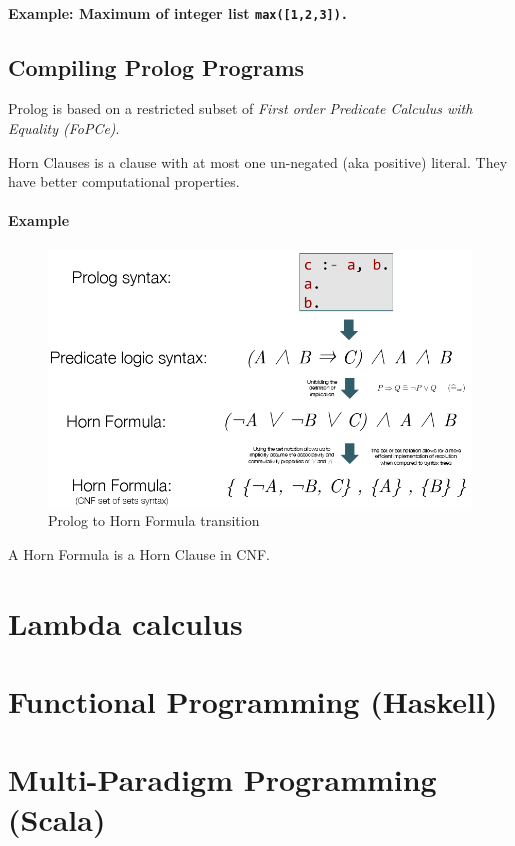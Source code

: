 \paragraph{Example: Maximum of integer list \lstinline|max([1,2,3]).|}


\subsection{Compiling Prolog Programs}

Prolog is based on a restricted subset of \emph{First order Predicate Calculus with Equality (FoPCe)}.

Horn Clauses is a clause with at most one un-negated (aka positive) literal. They have better computational properties.

\paragraph{Example}

\begin{figure}[h]
\centering
\includegraphics[width=0.4\linewidth]{images/prolog_to_horn_formula}
\caption{Prolog to Horn Formula transition}
\label{fig:prologtohornformula}
\end{figure}


A Horn Formula is a Horn Clause in CNF.

\section{Lambda calculus}

\section{Functional Programming (Haskell)}

\section{Multi-Paradigm Programming (Scala)}



